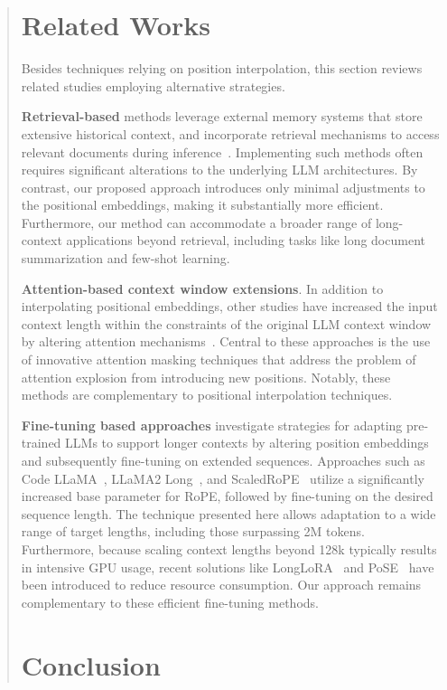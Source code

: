 \begin{abstract}
\section{Related Works}

Besides techniques relying on position interpolation, this section reviews related studies employing alternative strategies.

\textbf{Retrieval-based} methods leverage external memory systems that store extensive historical context, and incorporate retrieval mechanisms to access relevant documents during inference~\cite{longllama,wang2023augmenting,borgeaud2022improving}. Implementing such methods often requires significant alterations to the underlying LLM architectures. By contrast, our proposed approach introduces only minimal adjustments to the positional embeddings, making it substantially more efficient. Furthermore, our method can accommodate a broader range of long-context applications beyond retrieval, including tasks like long document summarization and few-shot learning.

\textbf{Attention-based context window extensions}. In addition to interpolating positional embeddings, other studies have increased the input context length within the constraints of the original LLM context window by altering attention mechanisms~\cite{han2023lminfinite, streamingllm,parallelwindow}. Central to these approaches is the use of innovative attention masking techniques that address the problem of attention explosion from introducing new positions. Notably, these methods are complementary to positional interpolation techniques.

\textbf{Fine-tuning based approaches} investigate strategies for adapting pre-trained LLMs to support longer contexts by altering position embeddings and subsequently fine-tuning on extended sequences. Approaches such as Code LLaMA~\cite{codellama}, LLaMA2 Long~\cite{xiong2023effective}, and ScaledRoPE~\cite{liu2023scaling} utilize a significantly increased base parameter for RoPE, followed by fine-tuning on the desired sequence length. The technique presented here allows adaptation to a wide range of target lengths, including those surpassing 2M tokens. Furthermore, because scaling context lengths beyond 128k typically results in intensive GPU usage, recent solutions like LongLoRA~\cite{longlora} and PoSE~\cite{zhu2023pose} have been introduced to reduce resource consumption. Our approach remains complementary to these efficient fine-tuning methods.

\section{Conclusion}


\end{abstract}
